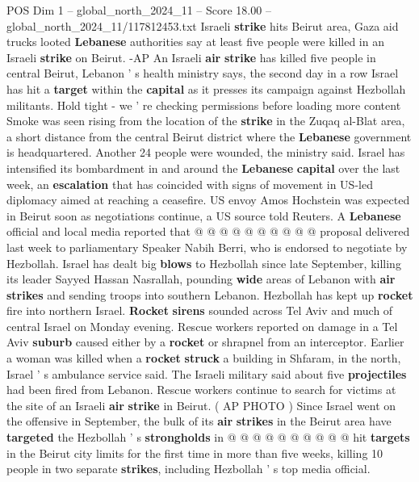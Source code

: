 \begin{textsample}{POS Dim 1 – global\_north\_2024\_11 – Score 18.00 – global\_north\_2024\_11/117812453.txt}  \label{ex:f1_pos_236}
Israeli \textbf{strike} hits Beirut area, Gaza aid trucks looted \textbf{Lebanese} authorities say at least five people were killed in an Israeli \textbf{strike} on Beirut. -AP An Israeli \textbf{air} \textbf{strike} has killed five people in central Beirut, Lebanon ' s health ministry says, the second day in a row Israel has hit a \textbf{target} within the \textbf{capital} as it presses its campaign against Hezbollah militants.
Hold tight - we ' re checking permissions before loading more content Smoke was seen rising from the location of the \textbf{strike} in the Zuqaq al-Blat area, a short distance from the central Beirut district where the \textbf{Lebanese} government is headquartered.
Another 24 people were wounded, the ministry said.
Israel has intensified its bombardment in and around the \textbf{Lebanese} \textbf{capital} over the last week, an \textbf{escalation} that has coincided with signs of movement in US-led diplomacy aimed at reaching a ceasefire.
US envoy Amos Hochstein was expected in Beirut soon as negotiations continue, a US source told Reuters.
A \textbf{Lebanese} official and local media reported that @ @ @ @ @ @ @ @ @ @ proposal delivered last week to parliamentary Speaker Nabih Berri, who is endorsed to negotiate by Hezbollah.
Israel has dealt big \textbf{blows} to Hezbollah since late September, killing its leader Sayyed Hassan Nasrallah, pounding \textbf{wide} areas of Lebanon with \textbf{air} \textbf{strikes} and sending troops into southern Lebanon.
Hezbollah has kept up \textbf{rocket} fire into northern Israel. \textbf{Rocket} \textbf{sirens} sounded across Tel Aviv and much of central Israel on Monday evening.
Rescue workers reported on damage in a Tel Aviv \textbf{suburb} caused either by a \textbf{rocket} or shrapnel from an interceptor.
Earlier a woman was killed when a \textbf{rocket} \textbf{struck} a building in Shfaram, in the north, Israel ' s ambulance service said.
The Israeli military said about five \textbf{projectiles} had been fired from Lebanon.
Rescue workers continue to search for victims at the site of an Israeli \textbf{air} \textbf{strike} in Beirut. ( AP PHOTO ) Since Israel went on the offensive in September, the bulk of its \textbf{air} \textbf{strikes} in the Beirut area have \textbf{targeted} the Hezbollah ' s \textbf{strongholds} in @ @ @ @ @ @ @ @ @ @ hit \textbf{targets} in the Beirut city limits for the first time in more than five weeks, killing 10 people in two separate \textbf{strikes}, including Hezbollah ' s top media official.

\end{textsample}
